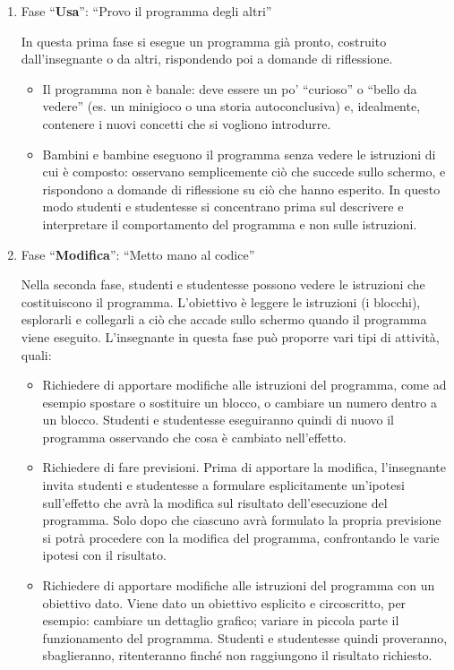 \begin{enumerate}
\item
  Fase ``\textbf{Usa}'': ``Provo il programma degli altri''

In questa prima fase si esegue un programma già pronto, costruito dall'insegnante o da altri, rispondendo poi a domande di riflessione.


\begin{itemize}
\item
  Il programma non è banale: deve essere un po' ``curioso'' o ``bello da vedere'' (es. un minigioco o una storia autoconclusiva) e, idealmente, contenere i nuovi concetti che si vogliono introdurre.
\item
  Bambini e bambine eseguono il programma senza vedere le istruzioni di cui è composto: osservano semplicemente ciò che succede sullo schermo, e rispondono a domande di riflessione su ciò che hanno esperito. In questo modo studenti e studentesse si concentrano prima sul descrivere e interpretare il comportamento del programma e non sulle istruzioni.
\end{itemize}

\item
  Fase ``\textbf{Modifica}'': ``Metto mano al codice''

Nella seconda fase, studenti e studentesse possono vedere le istruzioni che costituiscono il programma. L'obiettivo è leggere le istruzioni (i blocchi), esplorarli e collegarli a ciò che accade sullo schermo quando il programma viene eseguito. L'insegnante in questa fase può proporre vari tipi di attività, quali:

\begin{itemize}
\item
  Richiedere di apportare modifiche alle istruzioni del programma, come ad esempio spostare o sostituire un blocco, o cambiare un numero dentro a un blocco. Studenti e studentesse eseguiranno quindi di nuovo il programma osservando che cosa è cambiato nell'effetto.
\item
  Richiedere di fare previsioni. Prima di apportare la modifica, l'insegnante invita studenti e studentesse a formulare esplicitamente un'ipotesi sull'effetto che avrà la modifica sul risultato dell'esecuzione del programma. Solo dopo che ciascuno avrà formulato la propria previsione si potrà procedere con la modifica del programma, confrontando le varie ipotesi con il risultato.
\item
  Richiedere di apportare modifiche alle istruzioni del programma con un obiettivo dato. Viene dato un obiettivo esplicito e circoscritto, per esempio: cambiare un dettaglio grafico; variare in piccola parte il funzionamento del programma. Studenti e studentesse quindi proveranno, sbaglieranno, ritenteranno finché non raggiungono il risultato richiesto.
\end{itemize}



\end{enumerate}
